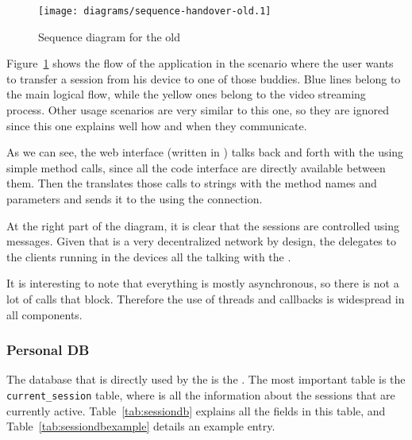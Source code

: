 \begin{figure}[htbp]
  \centering
    \texttt{[image: diagrams/sequence-handover-old.1]}
  \caption{Sequence diagram for the old }
  \label{fig:handoverscenarioold}
\end{figure}

Figure~\ref{fig:handoverscenarioold} shows the flow of the application in the scenario where the user wants to transfer a session from his device to one of those buddies.
Blue lines belong to the main logical flow, while the yellow ones belong to the video streaming process.
Other usage scenarios are very similar to this one, so they are ignored since this one explains well how and when they communicate.

As we can see, the web interface (written in ) talks back and forth with the  using simple method calls, since all the code interface are directly available between them.
Then the  translates those calls to strings with the method names and parameters and sends it to the  using the  connection.

At the right part of the diagram, it is clear that the sessions are controlled using  messages.
Given that  is a very decentralized network by design, the  delegates to the  clients running in the devices all the talking with the .

It is interesting to note that everything is mostly asynchronous, so there is not a lot of calls that block.
Therefore the use of threads and callbacks is widespread in all components.


\subsubsection{Personal DB} %
\label{ssub:personaldb}

The database that is directly used by the  is the . The most important table is the \texttt{current\_session} table, where is all the information about the sessions that are currently active.
Table~\ref{tab:sessiondb} explains all the fields in this table, and Table~\ref{tab:sessiondbexample} details an example entry.

